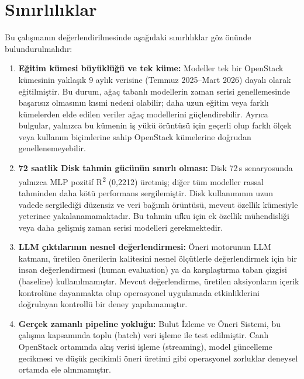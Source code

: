 \section{Sınırlılıklar}
\label{sec:sonuc-sinirliliklar}

Bu çalışmanın değerlendirilmesinde aşağıdaki sınırlılıklar göz önünde bulundurulmalıdır:

\begin{enumerate}
    \item \textbf{Eğitim kümesi büyüklüğü ve tek küme:}
    Modeller tek bir OpenStack kümesinin yaklaşık 9 aylık verisine (Temmuz 2025--Mart 2026) dayalı olarak eğitilmiştir.
    Bu durum, ağaç tabanlı modellerin zaman serisi genellemesinde başarısız olmasının kısmi nedeni olabilir; daha uzun eğitim veya farklı kümelerden elde edilen veriler ağaç modellerini güçlendirebilir.
    Ayrıca bulgular, yalnızca bu kümenin iş yükü örüntüsü için geçerli olup farklı ölçek veya kullanım biçimlerine sahip OpenStack kümelerine doğrudan genellenemeyebilir.

    \item \textbf{72 saatlik Disk tahmin gücünün sınırlı olması:}
    Disk 72\,s senaryosunda yalnızca MLP pozitif R\textsuperscript{2} (0{,}2212) üretmiş; diğer tüm modeller rassal tahminden daha kötü performans sergilemiştir.
    Disk kullanımının uzun vadede sergilediği düzensiz ve veri bağımlı örüntüsü, mevcut özellik kümesiyle yeterince yakalanamamaktadır.
    Bu tahmin ufku için ek özellik mühendisliği veya daha gelişmiş zaman serisi modelleri gerekmektedir.

    \item \textbf{LLM çıktılarının nesnel değerlendirmesi:}
    Öneri motorunun LLM katmanı, üretilen önerilerin kalitesini nesnel ölçütlerle değerlendirmek için bir insan değerlendirmesi (human evaluation) ya da karşılaştırma taban çizgisi (baseline) kullanılmamıştır.
    Mevcut değerlendirme, üretilen aksiyonların içerik kontrolüne dayanmakta olup operasyonel uygulamada etkinliklerini doğrulayan kontrollü bir deney yapılamamıştır.

    \item \textbf{Gerçek zamanlı pipeline yokluğu:}
    Bulut İzleme ve Öneri Sistemi, bu çalışma kapsamında toplu (batch) veri işleme ile test edilmiştir.
    Canlı OpenStack ortamında akış verisi işleme (streaming), model güncelleme gecikmesi ve düşük gecikimli öneri üretimi gibi operasyonel zorluklar deneysel ortamda ele alınmamıştır.
\end{enumerate}



